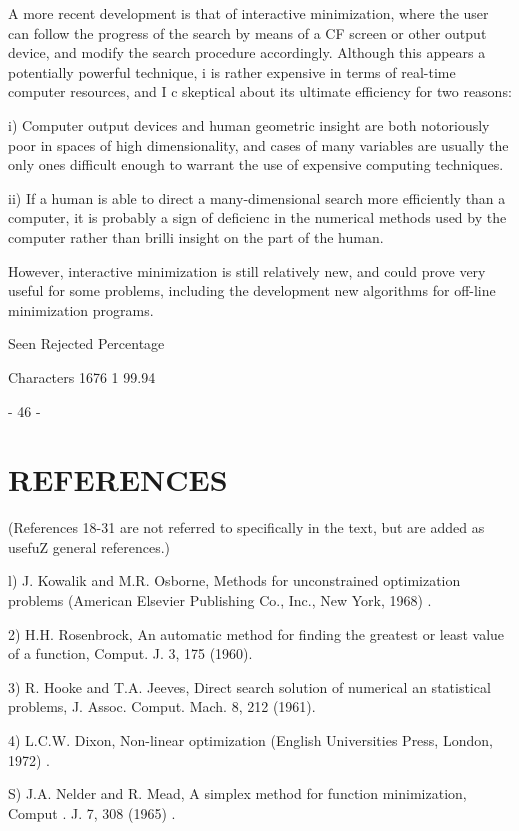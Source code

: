      A more recent development is that of interactive minimization,
where the user can follow the progress of the search by means of a CF
screen or other output device, and modify the search procedure accordingly.  Although this appears a potentially powerful technique, i
is rather expensive in terms of real-time computer resources, and I c
skeptical about its ultimate efficiency for two reasons:
 
  i) Computer output devices and human geometric insight are both
     notoriously poor in spaces of high dimensionality, and cases of
     many variables are usually the only ones difficult enough to
     warrant the use of expensive computing techniques.
 
 ii) If a human is able to direct a many-dimensional search more
     efficiently than a computer, it is probably a sign of deficienc
     in the numerical methods used by the computer rather than brilli
     insight on the part of the human.
 
     However, interactive minimization is still relatively new, and
could prove very useful for some problems, including the development
new  algorithms for off-line minimization programs.
 
                 Seen Rejected  Percentage
 
Characters       1676        1   99.94
 
                           - 46 -
                              \chapter{REFERENCES}
 
(References 18-31 are  not referred to specifically in the text, but are
added as usefuZ general  references.)
 
 
 l)  J. Kowalik and M.R. Osborne, Methods for unconstrained optimization
        problems (American Elsevier Publishing Co., Inc., New York,
        1968) .
 
 2) H.H. Rosenbrock, An automatic method for finding the greatest or
        least value of a function, Comput. J. 3, 175 (1960).
 
 3)  R. Hooke and T.A. Jeeves, Direct search solution of numerical an
        statistical problems, J. Assoc. Comput. Mach. 8, 212 (1961).
 
 4)  L.C.W. Dixon, Non-linear optimization  (English Universities Press,
        London, 1972) .
 
 S)  J.A. Nelder and R. Mead, A simplex method for function minimization,
        Comput . J. 7, 308 (1965) .
 
